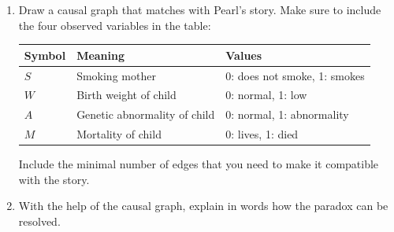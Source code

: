 \begin{enumerate}[label=\alph*)]
  \item Draw a causal graph that matches with Pearl's story.
    Make sure to include the four observed variables in the table:
    \begin{center}\small\begin{tabular}{lll}
      Symbol & Meaning & Values \\
      \hline
      $S$ & Smoking mother               & 0: does not smoke, 1: smokes \\ 
      $W$ & Birth weight of child        & 0: normal, 1: low \\
      $A$ & Genetic abnormality of child & 0: normal, 1: abnormality \\
      $M$ & Mortality of child           & 0: lives, 1: died \\
    \end{tabular}\end{center}
    Include the minimal number of edges that you need to make it compatible with the story.

  \item With the help of the causal graph, explain in words how the paradox can be resolved.
\end{enumerate}
